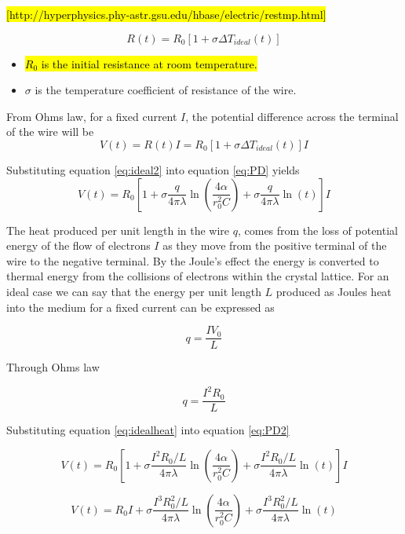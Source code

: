 \documentclass{article}
\begin{document}
\hl{[http://hyperphysics.phy-astr.gsu.edu/hbase/electric/restmp.html]}
	
$$R(t) = R_0 \left[ 1 + \sigma \Delta T_{ideal}(t) \right]$$

 	\begin{itemize}
 		\item[] \hl{$R_0$ is the initial resistance at room temperature.}
 		\item[] $\sigma$ is the temperature coefficient of resistance of the wire.
 	\end{itemize}

From Ohms law, for a fixed current $I$, the potential difference across the terminal of the wire will be
	\begin{equation} \label{eq:PD}
	V(t) = R(t)I = R_0 \left[ 1 + \sigma \Delta T_{ideal}(t) \right] I
	\end{equation}

Substituting equation \ref{eq:ideal2} into equation \ref{eq:PD} yields
	\begin{equation} \label{eq:PD2}
	V(t) = R_0 \left[ 1 + \sigma \frac{q}{4 \pi \lambda} \ln \left( \frac{4 \alpha }		{r^2_0 C}\right) + \sigma \frac{q}{4 \pi \lambda} \ln \left( t \right) \right] I
	\end{equation}

The heat produced per unit length in the wire $q$, comes from the loss of potential energy of the flow of electrons $I$ as they move from the positive terminal of the wire to the negative terminal. By the Joule's effect the energy is converted to thermal energy from the collisions of electrons within the crystal lattice.  
For an ideal case we can say that the energy per unit length $L$ produced as Joules heat into the medium for a fixed current  can be expressed as

$$q = \frac{IV_0}{L}$$

Through Ohms law 

	\begin{equation} \label{eq:idealheat}
	q = \frac{I^2R_0}{L}
	\end{equation}
	
\newpage

Substituting equation \ref{eq:idealheat} into equation \ref{eq:PD2}

$$V(t) = R_0 \left[ 1 + \sigma \frac{I^2R_0/L}{4 \pi \lambda} \ln \left( \frac{4 \alpha } {r^2_0 C}\right) + \sigma \frac{I^2R_0/L}{4 \pi \lambda} \ln \left( t \right) \right] I$$
	
	\begin{equation} \label{eq:PD3}
V(t) = R_0 I + \sigma \frac{I^3R_0^2/L}{4 \pi \lambda} \ln \left( \frac{4 \alpha } {r^2_0 C}\right) + \sigma \frac{I^3R_0^2/L}{4 \pi \lambda} \ln \left( t \right)
	\end{equation}
\end{document}
